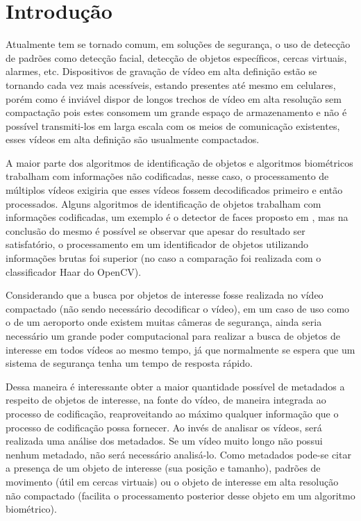 \chapter{Introdução}

Atualmente tem se tornado comum, em soluções de segurança, o uso de detecção de padrões como detecção facial, detecção de objetos específicos, cercas virtuais, alarmes, etc. Dispositivos de gravação de vídeo em alta definição estão se tornando cada vez mais acessíveis, estando presentes até mesmo em celulares, porém como é inviável dispor de longos trechos de vídeo em alta resolução sem compactação pois estes consomem um grande espaço de armazenamento e não é possível transmiti-los em larga escala com os meios de comunicação existentes, esses vídeos em alta definição são usualmente compactados.

A maior parte dos algoritmos de identificação de objetos e algoritmos biométricos trabalham com informações não codificadas, nesse caso, o processamento de múltiplos vídeos exigiria que esses vídeos fossem decodificados primeiro e então processados. Alguns algoritmos de identificação de objetos trabalham com informações codificadas, um exemplo é o detector de faces proposto em \cite{faceDetectionH264}, mas na conclusão do mesmo é possível se observar que apesar do resultado ser satisfatório, o processamento em um identificador de objetos utilizando informações brutas foi superior (no caso a comparação foi realizada com o classificador Haar do OpenCV).

Considerando que a busca por objetos de interesse fosse realizada no vídeo compactado (não sendo necessário decodificar o vídeo), em um caso de uso como o de um aeroporto onde existem muitas câmeras de segurança, ainda seria necessário um grande poder computacional para realizar a busca de objetos de interesse em todos vídeos ao mesmo tempo, já que normalmente se espera que um sistema de segurança tenha um tempo de resposta rápido. 

Dessa maneira é interessante obter a maior quantidade possível de metadados a respeito de objetos de interesse, na fonte do vídeo, de maneira integrada ao processo de codificação, reaproveitando ao máximo qualquer informação que o processo de codificação possa fornecer. Ao invés de analisar os vídeos, será realizada uma análise dos metadados. Se um vídeo muito longo não possui nenhum metadado, não será necessário analisá-lo. Como metadados pode-se citar a presença de um objeto de interesse (sua posição e tamanho), padrões de movimento (útil em cercas virtuais) ou o objeto de interesse em alta resolução não compactado (facilita o processamento posterior desse objeto em um algoritmo biométrico).

